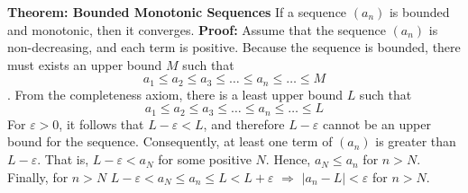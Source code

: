 \nopagenumbers
{\bf Theorem: Bounded Monotonic Sequences}
\vskip 6pt
If a sequence $(a_n)$ is bounded and monotonic, then it converges.
\vskip 10pt
{\bf Proof:}
\vskip 6pt
Assume that the sequence $(a_n)$ is non-decreasing, and each term is positive. Because the sequence is bounded, there must exists an upper bound $M$ such that $$a_1 \leq a_2 \leq a_3 \leq \ldots \leq a_n \leq \ldots \leq M$$. From the completeness axiom, there is a least upper bound $L$ such that $$a_1 \leq a_2 \leq a_3 \leq \ldots \leq a_n \leq \ldots \leq L$$ For $\varepsilon >0$, it follows that $L-\varepsilon<L$, and therefore $L-\varepsilon$ cannot be an upper bound for the sequence. Consequently, at least one term of $(a_n)$ is greater than $L-\varepsilon$. That is, $L-\varepsilon<a_N$ for some positive $N$. Hence, $a_N \leq a_n$ for $n>N$. Finally, for $n>N$ $L-\varepsilon < a_N \leq a_n \leq L <L+\varepsilon$ $\Rightarrow$ $|a_n-L|< \varepsilon$ for $n>N$.

\vfill\eject

